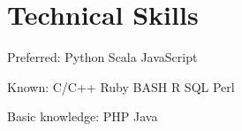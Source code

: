 \documentclass[]{deedy-resume-openfont}
\begin{document}







\section{Technical Skills}

\descript{}
\begin{tightemize}
\item Preferred: Python \textbullet{} Scala \textbullet{} JavaScript
\item Known: C/C++ \textbullet{} Ruby \textbullet{} 
BASH \textbullet{} R \textbullet{} SQL \textbullet{} Perl %
\item Basic knowledge: PHP \textbullet{} Java %
\end{tightemize}
\sectionsep
\end{document}

